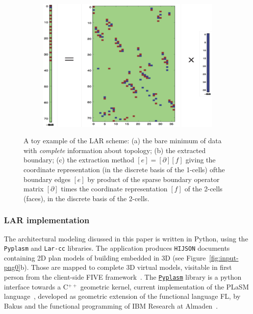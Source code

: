 \documentclass[]{egpubl}
\begin{document}
\begin{figure}[!h]
\begin{subfigure}[b]{0.48\linewidth}
  \caption{}
  \vspace*{4mm}
  \end{subfigure}
 \\
  \begin{subfigure}[b]{0.74\linewidth}
  \centering
  \includegraphics[width=\textwidth]{images/boundary}
  \caption{}
  \end{subfigure}
 
  \caption{A toy example of the LAR scheme: (a) the bare minimum of data with \emph{complete} information about topology; (b) the extracted boundary; (c) the extraction method $[e] = [\partial][f]$ giving the coordinate representation (in the discrete basis of the 1-cells) ofthe boundary edges $[e]$ by product of the sparse boundary operator matrix $[\partial]$ times the coordinate representation $[f]$ of the 2-cells (faces), in the discrete basis of the 2-cells.}
  \label{fig:minimum-data}
 \end{figure}


\subsubsection*{LAR implementation} 

The architectural modeling disussed in this paper is written in Python, using the \texttt{Pyplasm} and \texttt{Lar-cc} libraries.
The application produces \texttt{HIJSON} documents containing 2D plan models of building embedded in 3D (see Figure~\ref{fig:input-png0}b). Those are mapped to complete  3D virtual models, visitable in first person from the client-side  FIVE framework~\cite{Sportillo:2015,Virgadamo:2015}.
The \href{https://github.com/plasm-language/pyplasm}{\texttt{Pyplasm}}  library is a python interface towards a C$^{++}$ geometric kernel, current implementation of the  PLaSM language~\cite{Paoluzzi:1995:GPP:212332.212349,Paoluzzi2003a}, developed as geometric extension of the functional language FL, by Bakus and the functional programming of IBM Research at Almaden~\cite{Aiken91thefl,fl-1,backus:78}. 
\end{document}
